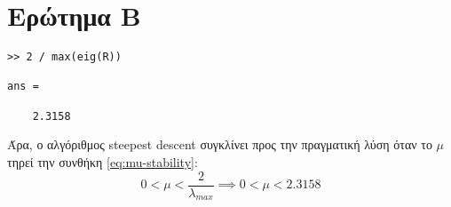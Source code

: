 \section{Ερώτημα Β}
\begin{lstlisting}
>> 2 / max(eig(R))

ans =

    2.3158
\end{lstlisting}
Άρα, ο αλγόριθμος steepest descent συγκλίνει προς την πραγματική λύση όταν το $\mu$ τηρεί την συνθήκη \eqref{eq:mu-stability}:
\begin{equation}
0 < \mu < \frac{2}{\lambda_{max}} \implies 0 < \mu < 2.3158\label{eq:mu-stability}
\end{equation}
